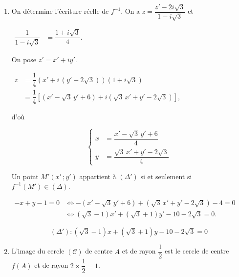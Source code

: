 \documentclass[12pt,a4paper]{article}
\begin{document}
\begin{enumerate}
\begin{enumerate}
    $
    \begin{aligned}
    \omega &= \dfrac{b}{1 - a} \\[1mm]
           &= \dfrac{2i\sqrt3}{i\sqrt3} \\[1mm]
           &= 2.
    \end{aligned}
    $

    \[
    \boxed{f \text{ est la similitude directe de centre } \Omega(2) \text{, de rapport } 2 \text{ et d'angle } -\dfrac{\pi}{3}.}
    \]

    \item On détermine l'écriture réelle de $f^{-1}$. On a $z = \dfrac{z' - 2i\sqrt3}{1 - i\sqrt3}$ et

    $
    \begin{aligned}
    \dfrac{1}{1 - i\sqrt3} &= \dfrac{1 + i\sqrt3}{4}.
    \end{aligned}
    $

    On pose $z' = x' + iy'$.

    $
    \begin{aligned}
    z &= \dfrac{1}{4}\left(x' + i\,(y' - 2\sqrt3)\right)\left(1 + i\sqrt3\right) \\[1mm]
      &= \dfrac{1}{4}\left[\left(x' - \sqrt3\,y' + 6\right) + i\left(\sqrt3\,x' + y' - 2\sqrt3\right)\right],
    \end{aligned}
    $

    d'où

    \[
    \left\{
    \begin{aligned}
    x &= \dfrac{x' - \sqrt3\,y' + 6}{4} \\[1mm]
    y &= \dfrac{\sqrt3\,x' + y' - 2\sqrt3}{4}
    \end{aligned}
    \right.
    \]

    Un point $M'(x'\,;y')$ appartient à $(\Delta')$ si et seulement si $f^{-1}(M') \in (\Delta)$.

    $
    \begin{aligned}
    -x + y - 1 = 0 &\iff -\left(x' - \sqrt3\,y' + 6\right) + \left(\sqrt3\,x' + y' - 2\sqrt3\right) - 4 = 0 \\[1mm]
                   &\iff \left(\sqrt3 - 1\right)x' + \left(\sqrt3 + 1\right)y' - 10 - 2\sqrt3 = 0.
    \end{aligned}
    $

    \[
    \boxed{(\Delta') : \left(\sqrt3 - 1\right)x + \left(\sqrt3 + 1\right)y - 10 - 2\sqrt3 = 0}
    \]

    \item L'image du cercle $(\mathscr{C})$ de centre $A$ et de rayon $\dfrac12$ est le cercle de centre $f(A)$ et de rayon $2\times\dfrac12 = 1$.


\end{enumerate}
\end{enumerate}
\end{document}
